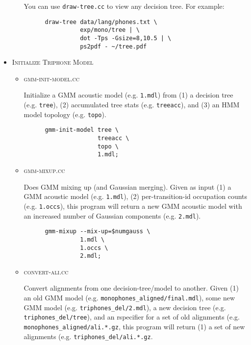 \documentclass[10pt,a4paper]{article}
\begin{document}
\begin{itemize}
\begin{itemize}
    You can use \texttt{draw-tree.cc} to view any decision tree. For example: \\ 

    \begin{verbatim} 
      draw-tree data/lang/phones.txt \
                exp/mono/tree | \
                dot -Tps -Gsize=8,10.5 | \
                ps2pdf - ~/tree.pdf
    \end{verbatim}

  \end{itemize}

\vspace{1cm}

\item \textsc{Initialize Triphone Model}

  \begin{itemize}

    \vspace{.25cm}

  \item \textsc{gmm-init-model.cc}

    Initialize a GMM acoustic model (e.g. \texttt{1.mdl}) from (1) a decision tree (e.g. \texttt{tree}), (2) accumulated tree stats (e.g. \texttt{treeacc}), and (3) an HMM model topology (e.g. \texttt{topo}).

    \begin{verbatim}
      gmm-init-model tree \
                     treeacc \
                     topo \
                     1.mdl;
    \end{verbatim}


  \item \textsc{gmm-mixup.cc}

    Does GMM mixing up (and Gaussian merging). Given as input (1) a GMM acoustic model (e.g. \texttt{1.mdl}), (2) per-transition-id occupation counts (e.g. \texttt{1.occs}), this program will return a new GMM acoustic model with an increased number of Gaussian components (e.g. \texttt{2.mdl}).

    \begin{verbatim}
      gmm-mixup --mix-up=$numgauss \
                1.mdl \
                1.occs \
                2.mdl;
    \end{verbatim}

  \item \textsc{convert-ali.cc}

   Convert alignments from one decision-tree/model to another. Given (1) an old GMM model (e.g. \texttt{monophones\_aligned/final.mdl}), some new GMM model (e.g. \texttt{triphones\_del/2.mdl}), a new decision tree (e.g. \texttt{triphones\_del/tree}), and an rspecifier for a set of old alignments (e.g. \texttt{monophones\_aligned/ali.*.gz}, this program will return (1) a set of new alignments (e.g. \texttt{triphones\_del/ali.*.gz}. 


\end{itemize}
\end{itemize}
\end{document}
